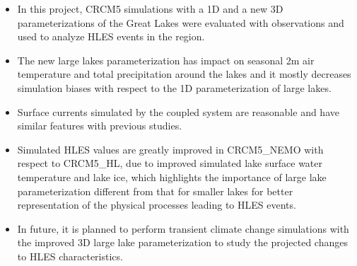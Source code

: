 \documentclass[a0b,landscape]{a0poster}
\begin{document}
\begin{multicols*}{4}
{  \begin{itemize}
  \item In this project, CRCM5 simulations with a 1D and a new 3D parameterizations of the Great Lakes were evaluated with observations and used to analyze HLES events in the region.
  \item The new large lakes parameterization has impact on seasonal 2m air temperature and total precipitation
        around the lakes and it mostly decreases simulation biases with respect to the
        1D parameterization of large lakes.
  \item Surface currents simulated by the coupled system are reasonable and have similar features with previous studies.
  \item Simulated HLES values are greatly improved in CRCM5\_NEMO with respect to
        CRCM5\_HL, due to improved simulated lake surface water temperature and lake
        ice, which highlights the importance of large lake parameterization different
        from that for smaller lakes for better representation of the physical processes
        leading to HLES events.
  \item In future, it is planned to perform transient climate change simulations with
        the improved 3D large lake parameterization to study the projected changes to
        HLES characteristics.
  \end{itemize}
}

\footnotesize
%

\end{multicols*}
\end{document}
